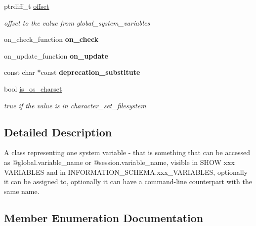 \begin{DoxyCompactItemize}
\mbox{\label{classsys__var_a78e5103c51e7bc209b9811e2c785ff99}} 
ptrdiff\+\_\+t \mbox{\hyperlink{classsys__var_a78e5103c51e7bc209b9811e2c785ff99}{offset}}
\begin{DoxyCompactList}\small\item\em offset to the value from global\+\_\+system\+\_\+variables \end{DoxyCompactList}\item 
\mbox{\label{classsys__var_a97bef987820df91b2f31fadabdb9754c}} 
on\+\_\+check\+\_\+function {\bfseries on\+\_\+check}
\item 
\mbox{\label{classsys__var_ab7c4526ac65dd980f351d1cd5a0be1e9}} 
on\+\_\+update\+\_\+function {\bfseries on\+\_\+update}
\item 
\mbox{\label{classsys__var_aecf83cfd68a0bae1dca5737b05bccf08}} 
const char $\ast$const {\bfseries deprecation\+\_\+substitute}
\item 
\mbox{\label{classsys__var_a725101611b3ee5d79fb9cf374c4460c7}} 
bool \mbox{\hyperlink{classsys__var_a725101611b3ee5d79fb9cf374c4460c7}{is\+\_\+os\+\_\+charset}}
\begin{DoxyCompactList}\small\item\em true if the value is in character\+\_\+set\+\_\+filesystem \end{DoxyCompactList}\end{DoxyCompactItemize}


\subsection{Detailed Description}
A class representing one system variable -\/ that is something that can be accessed as @global.\+variable\+\_\+name or @session.\+variable\+\_\+name, visible in S\+H\+OW xxx V\+A\+R\+I\+A\+B\+L\+ES and in I\+N\+F\+O\+R\+M\+A\+T\+I\+O\+N\+\_\+\+S\+C\+H\+E\+M\+A.\+xxx\+\_\+\+V\+A\+R\+I\+A\+B\+L\+ES, optionally it can be assigned to, optionally it can have a command-\/line counterpart with the same name. 

\subsection{Member Enumeration Documentation}
\mbox{\label{classsys__var_a664520ec82191888717c86085bfa83ce}} 
